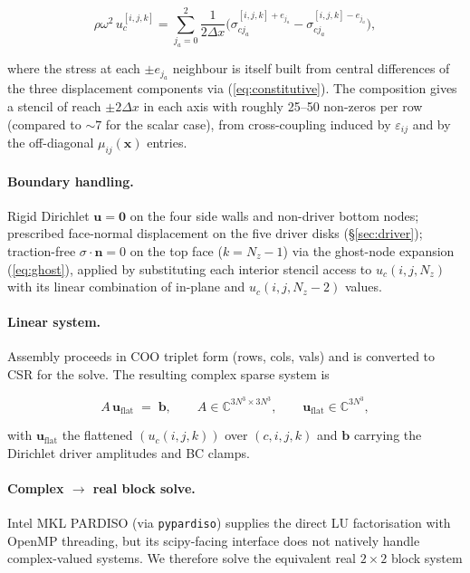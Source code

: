 \documentclass[11pt,letterpaper]{article}
\newcommand{\vect}[1]{\boldsymbol{#1}}
\begin{document}
\begin{equation}
\rho\omega^2\, u_c^{[i,j,k]}
= \sum_{j_{\!a} = 0}^{2}
    \frac{1}{2\Delta x}
    \bigl(\sigma_{c j_{\!a}}^{[i,j,k] + e_{j_{\!a}}}
        - \sigma_{c j_{\!a}}^{[i,j,k] - e_{j_{\!a}}}\bigr),
\label{eq:navier-fd}
\end{equation}

where the stress at each $\pm e_{j_{\!a}}$ neighbour is itself
built from central differences of the three displacement components
via (\ref{eq:constitutive}). The composition gives a stencil of
reach $\pm 2 \Delta x$ in each axis with roughly 25--50 non-zeros
per row (compared to $\sim 7$ for the scalar case), from
cross-coupling induced by $\varepsilon_{ij}$ and by the off-diagonal
$\mu_{ij}(\vect x)$ entries.

\paragraph{Boundary handling.}
Rigid Dirichlet $\vect u = \vect 0$ on the four side walls and
non-driver bottom nodes; prescribed face-normal displacement on the
five driver disks (\S\ref{sec:driver}); traction-free
$\sigma\cdot\vect n = 0$ on the top face ($k = N_z-1$) via the
ghost-node expansion (\ref{eq:ghost}), applied by substituting each
interior stencil access to $u_c(i,j,N_z)$ with its linear
combination of in-plane and $u_c(i,j,N_z{-}2)$ values.

\paragraph{Linear system.}
Assembly proceeds in COO triplet form (rows, cols, vals) and is
converted to CSR for the solve. The resulting complex sparse system
is

\begin{equation}
A\,\vect u_{\mathrm{flat}} \;=\; \vect b,
\qquad
A \in \mathbb{C}^{3N^{3}\times 3N^{3}},
\qquad
\vect u_{\mathrm{flat}} \in \mathbb{C}^{3N^{3}},
\end{equation}

with $\vect u_{\mathrm{flat}}$ the flattened $(u_c(i,j,k))$ over
$(c,i,j,k)$ and $\vect b$ carrying the Dirichlet driver amplitudes
and BC clamps.

\paragraph{Complex $\to$ real block solve.}
Intel MKL PARDISO (via \texttt{pypardiso}) supplies the direct LU
factorisation with OpenMP threading, but its scipy-facing interface
does not natively handle complex-valued systems. We therefore solve
the equivalent real $2\times 2$ block system
\end{document}
